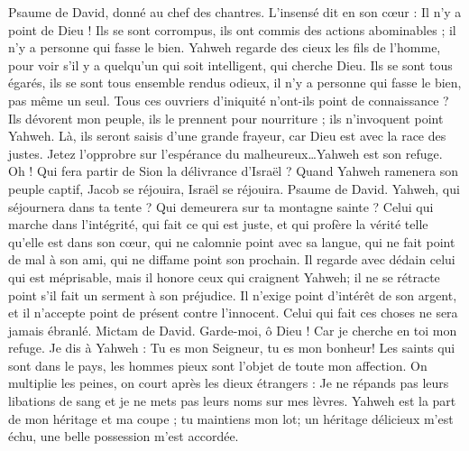 \begin{multicols}{2}
\VerseOne{}Psaume de David, donné au chef des chantres. L'insensé dit en son cœur : Il n'y a point de Dieu ! Ils se sont corrompus, ils ont commis des actions abominables ; il n'y a personne qui fasse le bien.
Yahweh regarde des cieux les fils de l'homme, pour voir s'il y a quelqu'un qui soit intelligent, qui cherche Dieu.
Ils se sont tous égarés, ils se sont tous ensemble rendus odieux, il n'y a personne qui fasse le bien, pas même un seul.
Tous ces ouvriers d'iniquité n'ont-ils point de connaissance ? Ils dévorent mon peuple, ils le prennent pour nourriture ; ils n'invoquent point Yahweh.
Là, ils seront saisis d'une grande frayeur, car Dieu est avec la race des justes.
Jetez l'opprobre sur l'espérance du malheureux…Yahweh est son refuge.
Oh ! Qui fera partir de Sion la délivrance d'Israël ? Quand Yahweh ramenera son peuple captif, Jacob se réjouira, Israël se réjouira.
\VerseOne{}Psaume de David. Yahweh, qui séjournera dans ta tente ? Qui demeurera sur ta montagne sainte ?
Celui qui marche dans l'intégrité, qui fait ce qui est juste, et qui profère la vérité telle qu'elle est dans son cœur,
qui ne calomnie point avec sa langue, qui ne fait point de mal à son ami, qui ne diffame point son prochain.
Il regarde avec dédain celui qui est méprisable, mais il honore ceux qui craignent Yahweh; il ne se rétracte point s'il fait un serment à son préjudice.
Il n'exige point d'intérêt de son argent, et il n'accepte point de présent contre l'innocent. Celui qui fait ces choses ne sera jamais ébranlé.
\VerseOne{}Mictam de David. Garde-moi, ô Dieu ! Car je cherche en toi mon refuge.
Je dis à Yahweh : Tu es mon Seigneur, tu es mon bonheur!
Les saints qui sont dans le pays, les hommes pieux sont l'objet de toute mon affection.
On multiplie les peines, on court après les dieux étrangers : Je ne répands pas leurs libations de sang et je ne mets pas leurs noms sur mes lèvres.
Yahweh est la part de mon héritage et ma coupe ; tu maintiens mon lot;
un héritage délicieux m'est échu, une belle possession m'est accordée.

\end{multicols}
